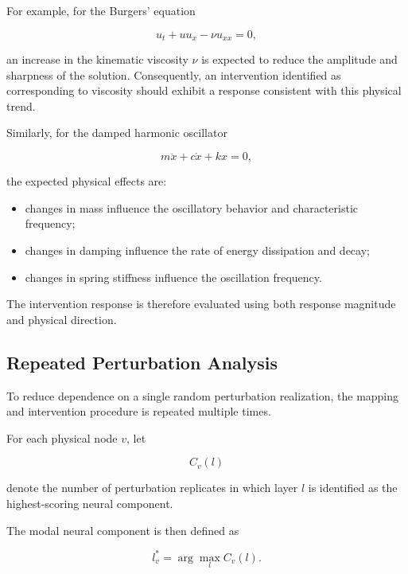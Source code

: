 \documentclass[12pt,singleside,a4paper]{article}
\begin{document}
For example, for the Burgers' equation

\begin{equation}
    u_t + u u_x - \nu u_{xx} = 0,
\end{equation}

an increase in the kinematic viscosity $\nu$ is expected to reduce the
amplitude and sharpness of the solution. Consequently, an intervention
identified as corresponding to viscosity should exhibit a response
consistent with this physical trend.

Similarly, for the damped harmonic oscillator

\begin{equation}
    m\ddot{x} + c\dot{x} + kx = 0,
\end{equation}

the expected physical effects are:

\begin{itemize}
    \item changes in mass influence the oscillatory behavior and
    characteristic frequency;
    
    \item changes in damping influence the rate of energy dissipation
    and decay;
    
    \item changes in spring stiffness influence the oscillation
    frequency.
\end{itemize}

The intervention response is therefore evaluated using both response
magnitude and physical direction.


\subsection{Repeated Perturbation Analysis}

To reduce dependence on a single random perturbation realization, the
mapping and intervention procedure is repeated multiple times.

For each physical node $v$, let

\begin{equation}
    C_v(l)
\end{equation}

denote the number of perturbation replicates in which layer $l$ is
identified as the highest-scoring neural component.

The modal neural component is then defined as

\begin{equation}
    l_v^*
    =
    \arg\max_l C_v(l).
\end{equation}
\end{document}
